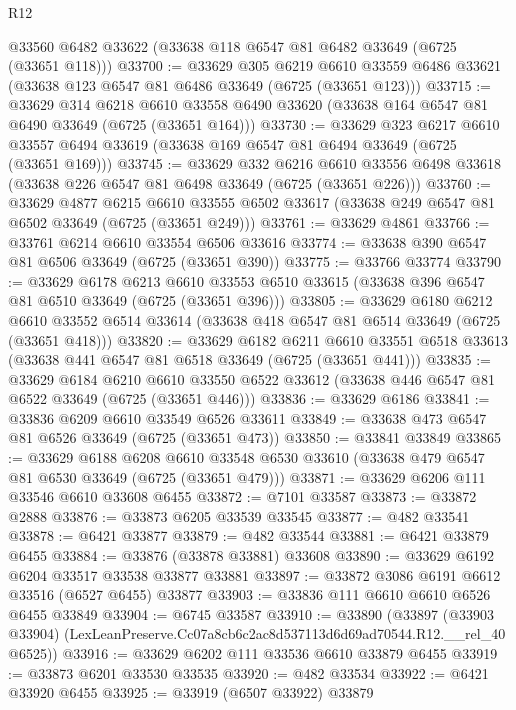 \begin{lexlean}{R12}
\begin{coremodule}
    @33560
    @6482
    @33622
    (@33638 @118 @6547 @81 @6482 @33649 (@6725 (@33651 @118)))
@33700 := @33629
    @305
    @6219
    @6610
    @33559
    @6486
    @33621
    (@33638 @123 @6547 @81 @6486 @33649 (@6725 (@33651 @123)))
@33715 := @33629
    @314
    @6218
    @6610
    @33558
    @6490
    @33620
    (@33638 @164 @6547 @81 @6490 @33649 (@6725 (@33651 @164)))
@33730 := @33629
    @323
    @6217
    @6610
    @33557
    @6494
    @33619
    (@33638 @169 @6547 @81 @6494 @33649 (@6725 (@33651 @169)))
@33745 := @33629
    @332
    @6216
    @6610
    @33556
    @6498
    @33618
    (@33638 @226 @6547 @81 @6498 @33649 (@6725 (@33651 @226)))
@33760 := @33629
    @4877
    @6215
    @6610
    @33555
    @6502
    @33617
    (@33638 @249 @6547 @81 @6502 @33649 (@6725 (@33651 @249)))
@33761 := @33629 @4861
@33766 := @33761 @6214 @6610 @33554 @6506 @33616
@33774 := @33638 @390 @6547 @81 @6506 @33649 (@6725 (@33651 @390))
@33775 := @33766 @33774
@33790 := @33629
    @6178
    @6213
    @6610
    @33553
    @6510
    @33615
    (@33638 @396 @6547 @81 @6510 @33649 (@6725 (@33651 @396)))
@33805 := @33629
    @6180
    @6212
    @6610
    @33552
    @6514
    @33614
    (@33638 @418 @6547 @81 @6514 @33649 (@6725 (@33651 @418)))
@33820 := @33629
    @6182
    @6211
    @6610
    @33551
    @6518
    @33613
    (@33638 @441 @6547 @81 @6518 @33649 (@6725 (@33651 @441)))
@33835 := @33629
    @6184
    @6210
    @6610
    @33550
    @6522
    @33612
    (@33638 @446 @6547 @81 @6522 @33649 (@6725 (@33651 @446)))
@33836 := @33629 @6186
@33841 := @33836 @6209 @6610 @33549 @6526 @33611
@33849 := @33638 @473 @6547 @81 @6526 @33649 (@6725 (@33651 @473))
@33850 := @33841 @33849
@33865 := @33629
    @6188
    @6208
    @6610
    @33548
    @6530
    @33610
    (@33638 @479 @6547 @81 @6530 @33649 (@6725 (@33651 @479)))
@33871 := @33629 @6206 @111 @33546 @6610 @33608 @6455
@33872 := @7101 @33587
@33873 := @33872 @2888
@33876 := @33873 @6205 @33539 @33545
@33877 := @482 @33541
@33878 := @6421 @33877
@33879 := @482 @33544
@33881 := @6421 @33879 @6455
@33884 := @33876 (@33878 @33881) @33608
@33890 := @33629 @6192 @6204 @33517 @33538 @33877 @33881
@33897 := @33872 @3086 @6191 @6612 @33516 (@6527 @6455) @33877
@33903 := @33836 @111 @6610 @6610 @6526 @6455 @33849
@33904 := @6745 @33587
@33910 := @33890
    (@33897 (@33903 @33904) (LexLeanPreserve.Cc07a8cb6c2ac8d537113d6d69ad70544.R12.__rel_40 @6525))
@33916 := @33629 @6202 @111 @33536 @6610 @33879 @6455
@33919 := @33873 @6201 @33530 @33535
@33920 := @482 @33534
@33922 := @6421 @33920 @6455
@33925 := @33919 (@6507 @33922) @33879

\end{coremodule}
\end{lexlean}
